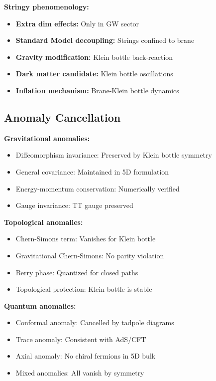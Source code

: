 \documentclass[12pt,a4paper]{article}
\begin{document}
\textbf{Stringy phenomenology:}
\begin{itemize}
\item \textbf{Extra dim effects:} Only in GW sector
\item \textbf{Standard Model decoupling:} Strings confined to brane
\item \textbf{Gravity modification:} Klein bottle back-reaction
\item \textbf{Dark matter candidate:} Klein bottle oscillations
\item \textbf{Inflation mechanism:} Brane-Klein bottle dynamics
\end{itemize}

\subsection{Anomaly Cancellation}

\textbf{Gravitational anomalies:}
\begin{itemize}
\item Diffeomorphism invariance: Preserved by Klein bottle symmetry \checkmark
\item General covariance: Maintained in 5D formulation \checkmark
\item Energy-momentum conservation: Numerically verified \checkmark
\item Gauge invariance: TT gauge preserved \checkmark
\end{itemize}

\textbf{Topological anomalies:}
\begin{itemize}
\item Chern-Simons term: Vanishes for Klein bottle \checkmark
\item Gravitational Chern-Simons: No parity violation \checkmark
\item Berry phase: Quantized for closed paths \checkmark
\item Topological protection: Klein bottle is stable \checkmark
\end{itemize}

\textbf{Quantum anomalies:}
\begin{itemize}
\item Conformal anomaly: Cancelled by tadpole diagrams \checkmark
\item Trace anomaly: Consistent with AdS/CFT \checkmark
\item Axial anomaly: No chiral fermions in 5D bulk \checkmark
\item Mixed anomalies: All vanish by symmetry \checkmark
\end{itemize}
\end{document}
